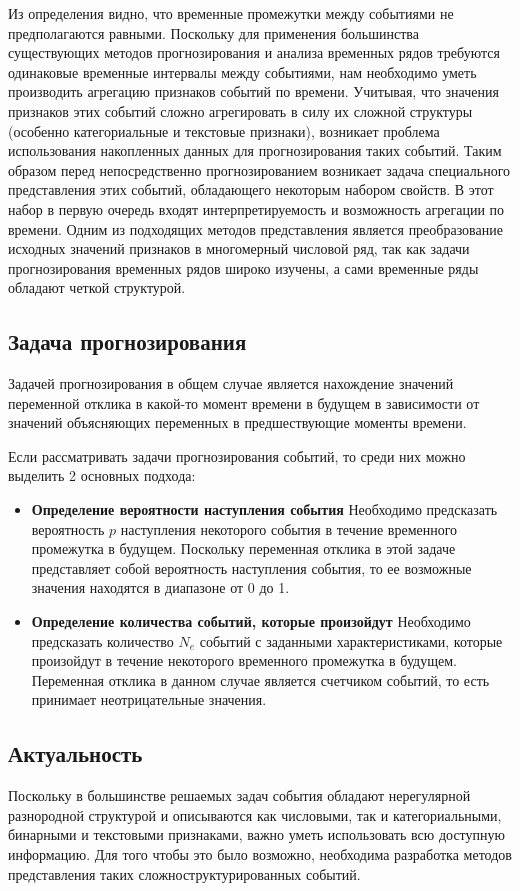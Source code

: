 Из определения видно, что временные промежутки между событиями не предполагаются равными. Поскольку для применения большинства существующих методов прогнозирования и анализа временных рядов требуются одинаковые временные интервалы между событиями, нам необходимо уметь производить агрегацию признаков событий по времени. Учитывая, что значения признаков этих событий сложно агрегировать в силу их сложной структуры (особенно категориальные и текстовые признаки), возникает проблема использования накопленных данных для прогнозирования таких событий. Таким образом перед непосредственно прогнозированием возникает задача специального представления этих событий, обладающего некоторым набором свойств. В этот набор в первую очередь входят интерпретируемость и возможность агрегации по времени. Одним из подходящих методов представления является преобразование исходных значений признаков в многомерный числовой ряд, так как задачи прогнозирования временных рядов широко изучены, а сами временные ряды обладают четкой структурой.

\subsection{Задача прогнозирования} \label{sect:event_forecast}
Задачей прогнозирования в общем случае является нахождение значений  переменной отклика в какой-то момент времени в будущем в зависимости от значений объясняющих переменных в предшествующие моменты времени.

Если рассматривать задачи прогнозирования событий, то среди них можно выделить 2 основных подхода:
\begin{itemize}
    \item \textbf{Определение вероятности наступления события}
        Необходимо предсказать вероятность $p$ наступления некоторого события в течение временного промежутка в будущем. Поскольку переменная отклика в этой задаче представляет собой вероятность наступления события, то ее возможные значения находятся в диапазоне от 0 до 1. 
        
    \item \textbf{Определение количества событий, которые произойдут}
        Необходимо предсказать количество $N_e$ событий с заданными характеристиками, которые произойдут в течение некоторого временного промежутка в будущем. Переменная отклика в данном случае является счетчиком событий, то есть принимает неотрицательные значения.
\end{itemize}

\subsection{Актуальность}
Поскольку в большинстве решаемых задач события обладают нерегулярной разнородной структурой и описываются как числовыми, так и категориальными, бинарными и текстовыми признаками, важно уметь использовать всю доступную информацию. Для того чтобы это было возможно, необходима разработка методов представления таких сложноструктурированных событий.  

